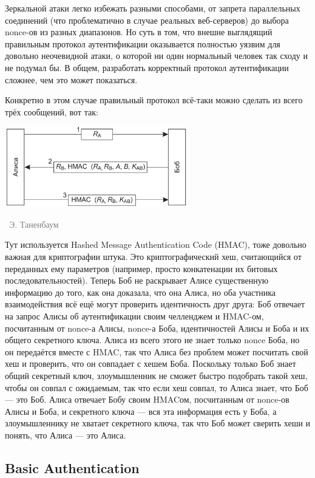 \documentclass[a5paper]{article}
\newcommand{\attribution}[1] {
\vspace{-5mm}\begin{flushright}\begin{scriptsize}\textcolor{gray}{\textcopyright\, #1}\end{scriptsize}\end{flushright}
}
\begin{document}
Зеркальной атаки легко избежать разными способами, от запрета параллельных соединений (что проблематично в случае реальных веб-серверов) до выбора nonce-ов из разных диапазонов. Но суть в том, что внешне выглядящий правильным протокол аутентификации оказывается полностью уязвим для довольно неочевидной атаки, о которой ни один нормальный человек так сходу и не подумал бы. В общем, разработать корректный протокол аутентификации сложнее, чем это может показаться.

Конкретно в этом случае правильный протокол всё-таки можно сделать из всего трёх сообщений, вот так:

\begin{center}
    \includegraphics[width=0.6\textwidth]{hmacs.png}
    \attribution{Э. Таненбаум}
\end{center}

Тут используется Hashed Message Authentication Code (HMAC), тоже довольно важная для криптографии штука. Это криптографический хеш, считающийся от переданных ему параметров (например, просто конкатенации их битовых последовательностей). Теперь Боб не раскрывает Алисе существенную информацию до того, как она доказала, что она Алиса, но оба участника взаимодействия всё ещё могут проверить идентичность друг друга: Боб отвечает на запрос Алисы об аутентификации своим челленджем и HMAC-ом, посчитанным от nonce-а Алисы, nonce-а Боба, идентичностей Алисы и Боба и их общего секретного ключа. Алиса из всего этого не знает только nonce Боба, но он передаётся вместе с HMAC, так что Алиса без проблем может посчитать свой хеш и проверить, что он совпадает с хешем Боба. Поскольку только Боб знает общий секретный ключ, злоумышленник не сможет быстро подобрать такой хеш, чтобы он совпал с ожидаемым, так что если хеш совпал, то Алиса знает, что Боб --- это Боб. Алиса отвечает Бобу своим HMACом, посчитанным от nonce-ов Алисы и Боба, и секретного ключа --- вся эта информация есть у Боба, а злоумышленнику не хватает секретного ключа, так что Боб может сверить хеши и понять, что Алиса --- это Алиса.

\subsection{Basic Authentication}
\end{document}
